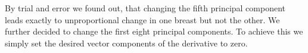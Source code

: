 By trial and error we found out, that changing the fifth principal component leads exactly to unproportional change in one breast but not the other. We further decided to change the first eight 
principal components. To achieve this we simply set the desired vector components of the derivative to zero.